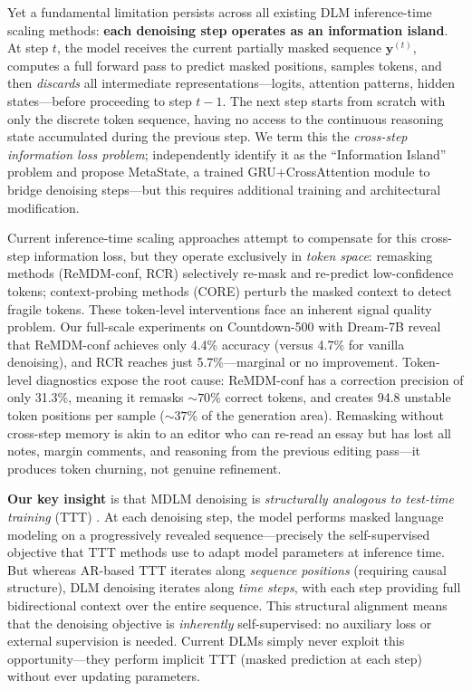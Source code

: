\documentclass{article}
\begin{document}
Yet a fundamental limitation persists across all existing DLM inference-time scaling methods: \textbf{each denoising step operates as an information island}. At step $t$, the model receives the current partially masked sequence $\mathbf{y}^{(t)}$, computes a full forward pass to predict masked positions, samples tokens, and then \emph{discards} all intermediate representations---logits, attention patterns, hidden states---before proceeding to step $t{-}1$. The next step starts from scratch with only the discrete token sequence, having no access to the continuous reasoning state accumulated during the previous step. We term this the \emph{cross-step information loss problem}; \citet{xia2026metastate} independently identify it as the ``Information Island'' problem and propose MetaState, a trained GRU+CrossAttention module to bridge denoising steps---but this requires additional training and architectural modification.

Current inference-time scaling approaches attempt to compensate for this cross-step information loss, but they operate exclusively in \emph{token space}: remasking methods (ReMDM-conf, RCR) selectively re-mask and re-predict low-confidence tokens; context-probing methods (CORE) perturb the masked context to detect fragile tokens. These token-level interventions face an inherent signal quality problem. Our full-scale experiments on Countdown-500 with Dream-7B reveal that ReMDM-conf achieves only 4.4\% accuracy (versus 4.7\% for vanilla denoising), and RCR reaches just 5.7\%---marginal or no improvement. Token-level diagnostics expose the root cause: ReMDM-conf has a correction precision of only 31.3\%, meaning it remasks ${\sim}70$\% correct tokens, and creates 94.8 unstable token positions per sample (${\sim}37$\% of the generation area). Remasking without cross-step memory is akin to an editor who can re-read an essay but has lost all notes, margin comments, and reasoning from the previous editing pass---it produces token churning, not genuine refinement.

\textbf{Our key insight} is that MDLM denoising is \emph{structurally analogous to test-time training} (TTT) \citep{sun2024ttt, titans2025}. At each denoising step, the model performs masked language modeling on a progressively revealed sequence---precisely the self-supervised objective that TTT methods use to adapt model parameters at inference time. But whereas AR-based TTT iterates along \emph{sequence positions} (requiring causal structure), DLM denoising iterates along \emph{time steps}, with each step providing full bidirectional context over the entire sequence. This structural alignment means that the denoising objective is \emph{inherently} self-supervised: no auxiliary loss or external supervision is needed. Current DLMs simply never exploit this opportunity---they perform implicit TTT (masked prediction at each step) without ever updating parameters.
\end{document}
